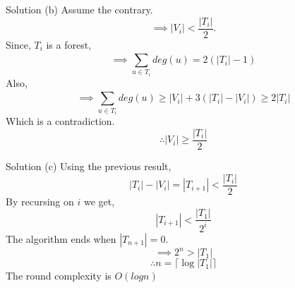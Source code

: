 \begin{solution*}{Solution (b)}{}
	Assume the contrary.
	\[\implies |V_i| < \frac{|T_i|}{2}. \]
	Since, $T_i$ is a forest,
	\[\implies \sum_{u \in T_i}^{} deg(u) = 2(|T_i| - 1)\]
	Also,
	\[\implies \sum_{u \in T_i}^{} deg(u) \geq |V_i| + 3(|T_i| - |V_i|) \geq 2|T_i|\]
	Which is a contradiction.
	\[ \therefore |V_i| \geq \frac{|T_i|}{2}\]
\end{solution*}

\begin{solution*}{Solution (c)}{}
	Using the previous result,
	\[ |T_i| - |V_i| = |T_{i+1}| < \frac{|T_i|}{2} \]
	By recursing on $i$ we get,
	\[ |T_{i+1}| < \frac{|T_1|}{2^{i}}\]
	The algorithm ends when $|T_{n+1}| = 0$.
	\[ \implies 2^n > |T_1|\]
	\[ \therefore n = \lceil \log |T_1| \rceil \] 
	The round complexity is $O(logn)$
\end{solution*}

